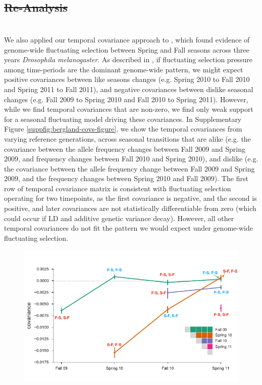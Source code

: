\documentclass[11pt]{article}
\providecommand{\DIFaddtex}[1]{{\protect\color{blue}\uwave{#1}}} %
\providecommand{\DIFdeltex}[1]{{\protect\color{red}\sout{#1}}}                      %
\providecommand{\DIFaddbegin}{} %
\providecommand{\DIFaddend}{} %
\providecommand{\DIFdelbegin}{} %
\providecommand{\DIFdelend}{} %
\providecommand{\DIFadd}[1]{\texorpdfstring{\DIFaddtex{#1}}{#1}} %
\providecommand{\DIFdel}[1]{\texorpdfstring{\DIFdeltex{#1}}{}} %
\begin{document}
{\DIFdelbegin \subsection{\DIFdel{\textcite{Bergland2014-ij} Re-Analysis}}
\addtocounter{subsection}{-1}%
\DIFdelend \DIFaddbegin \section{\DIFadd{\textcite{Bergland2014-ij} Re-Analysis}}
\DIFaddend \label{supp:bergland-reanalysis}


We also applied our temporal covariance approach to \textcite{Bergland2014-ij},
which found evidence of genome-wide fluctuating selection between Spring and
Fall seasons across three years \emph{Drosophila melanogaster}. As described in
\textcite{Buffalo2019-io}, if fluctuating selection pressure among time-periods
are the dominant genome-wide pattern, we might expect positive covariances
between like seasons changes (e.g. Spring 2010 to Fall 2010 and Spring
2011 to Fall 2011), and negative covariances between dislike seasonal changes
(e.g. Fall 2009 to Spring 2010 and Fall 2010 to Spring 2011). However,
while we find temporal covariances that are non-zero, we find only weak support
for a seasonal fluctuating model driving these covariances. In Supplementary
Figure \ref{suppfig:bergland-covs-figure}, we show the temporal covariances
from varying reference generations, across seasonal transitions that are alike
(e.g.  the covariance between the allele frequency changes between Fall 2009
and Spring 2009, and frequency changes between Fall 2010 and Spring 2010), and
dislike (e.g. the covariance between the allele frequency change between Fall
2009 and Spring 2009, and the frequency changes between Spring 2010 and Fall
2009). The first row of temporal covariance matrix is consistent with
fluctuating selection operating for two timepoints, as the first covariance is
negative, and the second is positive, and later covariances are not
statistically differentiable from zero (which could occur if LD and additive
genetic variance decay). However, all other temporal covariances do not fit
the pattern we would expect under genome-wide fluctuating selection.

\begin{figure}[!ht]
  \centering
  \includegraphics[]{figures/bergland-covs-figure.pdf}


\end{figure}}
\end{document}
